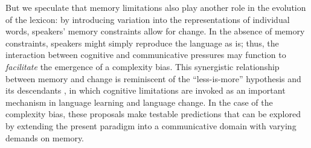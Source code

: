 But we speculate that memory limitations also play another role in the evolution of the lexicon: by introducing variation into the representations of individual words, speakers' memory constraints allow for change. In the absence of memory constraints, speakers might simply reproduce the language as is; thus, the interaction between cognitive and communicative pressures may function to {\it facilitate} the emergence of a complexity bias. 
This synergistic relationship between memory and change is reminiscent of the ``less-is-more'' hypothesis and its descendants \cite{newport1990maturational,hudson-kam2005}, in which cognitive limitations are invoked as an important mechanism in language learning and language change. In the case of the complexity bias, these proposals make testable predictions that can be explored by extending the present paradigm into a communicative domain with varying demands on memory.




